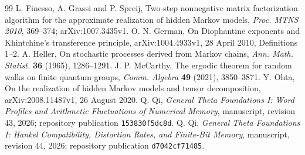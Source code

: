 \begin{thebibliography}{99}
 L. Finesso, A. Grassi and P. Spreij,
Two-step nonnegative matrix factorization algorithm for the approximate realization of hidden Markov models,
\emph{Proc. MTNS 2010}, 369--374; arXiv:1007.3435v1.
 O. N. German,
On Diophantine exponents and Khintchine's transference principle,
arXiv:1004.4933v1, 28 April 2010, Definitions 1--2.
 A. Heller,
On stochastic processes derived from Markov chains,
\emph{Ann. Math. Statist.} \textbf{36} (1965), 1286--1291.
 J. P. McCarthy,
The ergodic theorem for random walks on finite quantum groups,
\emph{Comm. Algebra} \textbf{49} (2021), 3850--3871.
 Y. Ohta,
On the realization of hidden Markov models and tensor decomposition,
arXiv:2008.11487v1, 26 August 2020.
 Q. Qi,
\emph{General Theta Foundations I: Word Profiles and Arithmetic Fluctuations of Numerical Memory}, manuscript, revision 43, 2026; repository publication \texttt{153830f5dc8d}.
 Q. Qi,
\emph{General Theta Foundations I: Hankel Compatibility, Distortion Rates, and Finite-Bit Memory}, manuscript, revision 44, 2026; repository publication \texttt{d7042cf71485}.
\end{thebibliography}
